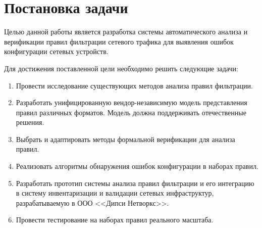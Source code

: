 \section{Постановка задачи}
\label{sec:Section1} 

Целью данной работы является разработка системы автоматического анализа и верификации правил фильтрации
сетевого трафика для выявления ошибок конфигурации сетевых устройств.

Для достижения поставленной цели необходимо решить следующие задачи:

\begin{enumerate}
    \item Провести исследование существующих методов анализа правил фильтрации.
    \item Разработать унифицированную вендор-независимую модель представления правил различных форматов.
    Модель должна поддерживать отечественные решения.
    \item Выбрать и адаптировать методы формальной верификации для анализа правил.
    \item Реализовать алгоритмы обнаружения ошибок конфигурации в наборах правил.
    \item Разработать прототип системы анализа правил фильтрации
    и его интеграцию в систему инвентаризации и валидации сетевых инфраструктур, разрабатываемую в ООО <<Дипси Нетворкс>>.
    \item Провести тестирование на наборах правил реального масштаба.
\end{enumerate}

\newpage
